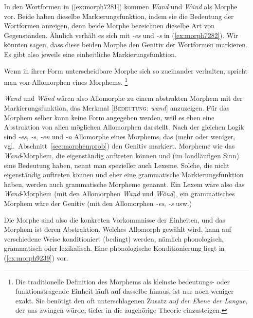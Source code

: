 In den Wortformen in (\ref{ex:morph7281}) kommen \textit{Wand} und \textit{Wänd} als Morphe vor.
Beide haben dieselbe Markierungsfunktion, indem sie die Bedeutung der Wortformen anzeigen, denn beide Morphe bezeichnen dieselbe Art von Gegenständen.
Ähnlich verhält es sich mit \textit{-es} und \textit{-s} in (\ref{ex:morph7282}).
Wir könnten sagen, dass diese beiden Morphe den Genitiv der Wortformen markieren.
Es gibt also jeweils eine einheitliche Markierungsfunktion.

Wenn in ihrer Form unterscheidbare Morphe sich so zueinander verhalten, spricht man von Allomorphen eines Morphems.%
\footnote{Die traditionelle Definition des Morphems als kleinste bedeutungs- oder funktionstragende Einheit läuft auf dasselbe hinaus, ist nur noch weniger exakt.
Sie benötigt \zB den oft unterschlagenen Zusatz \textit{auf der Ebene der Langue}, der uns zwingen würde, tiefer in die zugehörige Theorie einzusteigen.}


\textit{Wand} und \textit{Wänd} wären also Allomorphe zu einem abstrakten Morphem mit der Markierungsfunktion, das Merkmal [\textsc{Bedeutung}: \textit{wand}] anzuzeigen.
Für das Morphem selber kann keine Form angegeben werden, weil es eben eine Abstraktion von allen möglichen Allomorphen darstellt.
Nach der gleichen Logik sind \textit{-es}, \textit{-s}, \textit{-en} und \textit{-n} Allomorphe eines Morphems, das (mehr oder weniger, vgl.\ Abschnitt~\ref{sec:morphemprob}) den Genitiv markiert.
Morpheme wie das \textit{Wand}-Morphem, die eigenständig auftreten können und (im landläufigen Sinn) eine Bedeutung haben, nennt man spezieller auch Lexeme.
Solche, die nicht eigenständig auftreten können und eher eine grammatische Markierungsfunktion haben, werden auch grammatische Morpheme genannt.
Ein Lexem wäre also das \textit{Wand}-Morphem (mit den Allomorphen \textit{Wand} und \textit{Wänd}), ein grammatisches Morphem wäre der Genitiv (mit den Allomorphen \textit{-es}, \textit{-s} usw.)

Die Morphe sind also die konkreten Vorkommnisse der Einheiten, und das Morphem ist deren Abstraktion.
Welches Allomorph gewählt wird, kann auf verschiedene Weise konditioniert (bedingt) werden, nämlich phonologisch, grammatisch oder lexikalisch.
Eine phonologische Konditionierung liegt in (\ref{ex:morph9239}) vor.

